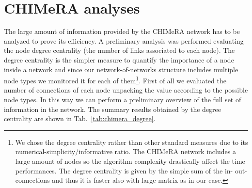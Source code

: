 \documentclass{standalone}
\begin{document}
\section[CHIMeRA analyses]{CHIMeRA analyses}\label{chimera:res}

The large amount of information provided by the \textsf{CHIMeRA} network has to be analyzed to prove its efficiency.
A preliminary analysis was performed evaluating the node degree centrality (the number of links associated to each node).
The degree centrality is the simpler measure to quantify the importance of a node inside a network and since our network-of-networks structure includes multiple node types we monitored it for each of them\footnote{
  We chose the degree centrality rather than other standard measures due to its numerical-simplicity/informative ratio.
  The \textsf{CHIMeRA} network includes a large amount of nodes so the algorithm complexity drastically affect the time performances.
  The degree centrality is given by the simple sum of the in- out-connections and thus it is faster also with large matrix as in our case.
}.
First of all we evaluated the number of connections of each node unpacking the value according to the possible node types.
In this way we can perform a preliminary overview of the full set of information in the network.
The summary results obtained by the degree centrality are shown in Tab.~\ref{tab:chimera_degree}.
\end{document}

